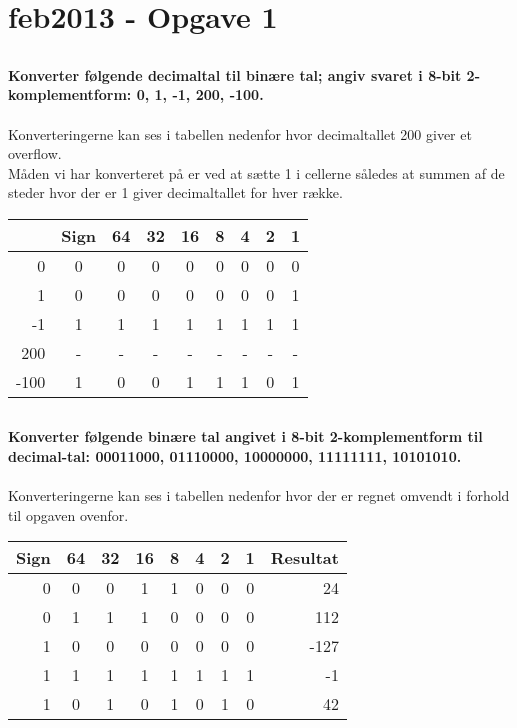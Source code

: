 \documentclass[a4,11pt]{article}
\begin{document}
\section{feb2013 - Opgave 1}
\subsection{}
\textbf{Konverter følgende decimaltal til binære tal; angiv svaret i 8-bit 2-komplementform: 0, 1, -1, 200, -100.}
\\\\
Konverteringerne kan ses i tabellen nedenfor hvor decimaltallet 200 giver et overflow.\\
Måden vi har konverteret på er ved at sætte 1 i cellerne således at summen af de steder hvor der er 1 giver decimaltallet for hver række. 
\begin{center}
\begin{tabular}{| r | c | c | c | c | c | c | c | c |}
\hline
   		& Sign 	& 64 & 32 & 16 & 8 & 4 & 2 & 1\\\hline
  0 		& 0 		& 0 & 0 & 0 & 0 & 0 & 0 & 0 \\\hline
  1 		& 0 		& 0 & 0 & 0 & 0 & 0 & 0 & 1\\\hline
  -1 		& 1 		& 1 & 1 & 1 & 1 & 1 & 1 & 1 \\\hline
  200		& - 		& - & - & - & - & - & - & -\\\hline
  -100 	& 1 		& 0 & 0 & 1 & 1 & 1 & 0 & 1\\ \hline
\end{tabular}
\end{center}


\subsection{}
\textbf{Konverter følgende binære tal angivet i 8-bit 2-komplementform til decimal-tal: 00011000, 01110000, 10000000, 11111111, 10101010.}
\\\\
Konverteringerne kan ses i tabellen nedenfor hvor der er regnet omvendt i forhold til opgaven ovenfor.
\begin{center}
\begin{tabular}{| r | c | c | c | c | c | c | c | r |}
\hline
Sign   	& 64 	& 32 & 16 & 8 & 4 & 2 & 1 & Resultat\\\hline
0 		& 0 		& 0 & 1 & 1 & 0 & 0 & 0 & 24 \\\hline
0 		& 1 		& 1 & 1 & 0 & 0 & 0 & 0 & 112\\\hline
1 		& 0 		& 0 & 0 & 0 & 0 & 0 & 0 & -127 \\\hline
1		& 1 		& 1 & 1 & 1 & 1 & 1 & 1 & -1\\\hline
1 		& 0 		& 1 & 0 & 1 & 0 & 1 & 0 & 42\\ \hline
\end{tabular}
\end{center}
\end{document}
